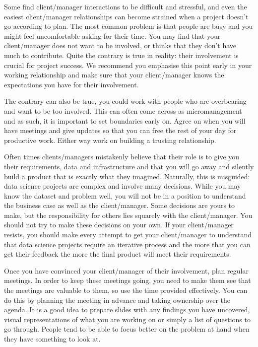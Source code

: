 \documentclass[
]{book}
\begin{document}
Some find client/manager interactions to be difficult and stressful, and even the easiest client/manager relationships can become strained when a project doesn't go according to plan. The most common problem is that people are busy and you might feel uncomfortable asking for their time. You may find that your client/manager does not want to be involved, or thinks that they don't have much to contribute. Quite the contrary is true in reality: their involvement is crucial for project success. We recommend you emphasise this point early in your working relationship and make sure that your client/manager knows the expectations you have for their involvement.

The contrary can also be true, you could work with people who are overbearing and want to be too involved. This can often come across as micromanagement and as such, it is important to set boundaries early on. Agree on when you will have meetings and give updates so that you can free the rest of your day for productive work. Either way work on building a trusting relationship.

Often times clients/managers mistakenly believe that their role is to give you their requirements, data and infrastructure and that you will go away and silently build a product that is exactly what they imagined. Naturally, this is misguided: data science projects are complex and involve many decisions. While you may know the dataset and problem well, you will not be in a position to understand the business case as well as the client/manager. Some decisions are yours to make, but the responsibility for others lies squarely with the client/manager. You should not try to make these decisions on your own. If your client/manager resists, you should make every attempt to get your client/manager to understand that data science projects require an iterative process and the more that you can get their feedback the more the final product will meet their requirements.

Once you have convinced your client/manager of their involvement, plan regular meetings. In order to keep these meetings going, you need to make them see that the meetings are valuable to them, so use the time provided effectively. You can do this by planning the meeting in advance and taking ownership over the agenda. It is a good idea to prepare slides with any findings you have uncovered, visual representations of what you are working on or simply a list of questions to go through. People tend to be able to focus better on the problem at hand when they have something to look at.
\end{document}
